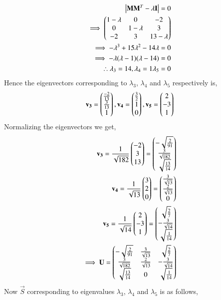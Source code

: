 \documentclass[journal,12pt,twocolumn]{IEEEtran}
\begin{document}
\begin{align}
\begin{vmatrix}\mathbf{M}\mathbf{M}^T-\lambda\mathbf{I}\end{vmatrix} = 0\\
\implies \begin{pmatrix}1-\lambda&0&-2\\0&1-\lambda&3\\-2&3&13-\lambda\end{pmatrix}\\
\implies -\lambda^3+15\lambda^2-14\lambda = 0\\
\implies -\lambda(\lambda-1)(\lambda-14) = 0\\
\therefore \lambda_3 = 14, \lambda_4 = 1\label{eq:lambda4} \lambda_5 = 0\label{eq:lambda5}
\end{align} 
Hence the eigenvectors corresponding to $\lambda_3$, $\lambda_4$ and  $\lambda_5$ respectively is,
\begin{align}
\mathbf{v_3} =\begin{pmatrix}\frac{-2}{13}\\\frac{3}{13}\\1\end{pmatrix},
\mathbf{v_4} =\begin{pmatrix}\frac{3}{2}\\1\\0\end{pmatrix},
\mathbf{v_5} = \begin{pmatrix}2\\-3\\1\end{pmatrix}
\end{align}
Normalizing the eigenvectors we get,
\begin{align}
\mathbf{v_3} = \frac{1}{\sqrt{182}}\begin{pmatrix}-2\\3\\13\end{pmatrix} = \begin{pmatrix}-\sqrt{\frac{2}{91}}\\\frac{3}{\sqrt{182}}\\\sqrt{\frac{13}{14}}\end{pmatrix}\\
\mathbf{v_4} = \frac{1}{\sqrt{13}}\begin{pmatrix}3\\2\\0\end{pmatrix} = \begin{pmatrix}\frac{3}{\sqrt{13}}\\\frac{2}{\sqrt{13}}\\0\end{pmatrix}\\
\mathbf{v_5} = \frac{1}{\sqrt{14}}\begin{pmatrix}2\\-3\\1\end{pmatrix}= \begin{pmatrix}\sqrt{\frac{2}{7}}\\-\frac{3}{\sqrt{14}}\\\sqrt{\frac{1}{14}}\end{pmatrix}\\
\implies \mathbf{U} = \begin{pmatrix}-\sqrt{\frac{2}{91}} &\frac{3}{\sqrt{13}} & \sqrt{\frac{2}{7}}\\\frac{3}{\sqrt{182}} &\frac{2}{\sqrt{13}} &-\frac{3}{\sqrt{14}} \\\sqrt{\frac{13}{14}} &0 & \sqrt{\frac{1}{14}}\end{pmatrix} \label{eq:U}
\end{align} 
Now $\vec{S}$ corresponding to eigenvalues $\lambda_3$, $\lambda_4$ and  $\lambda_5$ is as follows,
\end{document}
